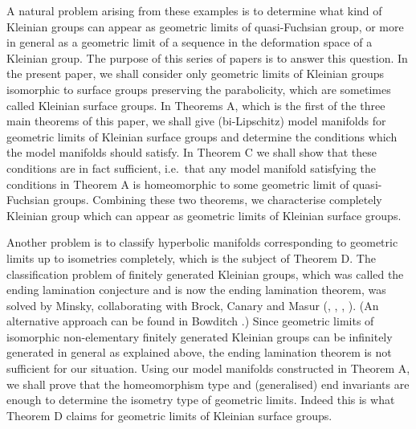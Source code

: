 \documentclass{amsart}
\theoremstyle{definition}
\numberwithin{figure}{section}
\numberwithin{equation}{section}
\newcommand{\ie}{i.e.\ }
\begin{document}
A natural problem arising from these examples is to determine what kind of Kleinian groups can appear as geometric limits of quasi-Fuchsian group, or more in general as a geometric limit of a sequence in the deformation space of a Kleinian group.
The purpose of this series of papers is to answer this question.
In the present paper, we shall consider only geometric limits of Kleinian groups isomorphic to surface groups preserving the parabolicity, which are sometimes called Kleinian surface groups.
In Theorems A, which is the first of the three main theorems of this paper, we shall give (bi-Lipschitz) model manifolds for geometric limits of Kleinian surface groups and determine the conditions which the model manifolds should satisfy.
In Theorem C we shall show that these conditions are in fact sufficient, \ie that any model manifold satisfying the conditions in Theorem A is homeomorphic to some geometric limit of quasi-Fuchsian groups.
Combining these two theorems, we characterise completely Kleinian group which can appear as geometric limits of Kleinian surface groups.

Another problem is to classify hyperbolic manifolds corresponding to geometric limits up to isometries completely, which is the subject of Theorem D.
The classification problem of finitely generated Kleinian groups, which was called the ending lamination conjecture and is now the ending lamination theorem, was solved by Minsky, collaborating with Brock, Canary and Masur (\cite{mm1}, \cite{mm2}, \cite{mi2}, \cite{bcm}).
(An alternative approach can be found in Bowditch \cite{bow4}.)
Since geometric limits of isomorphic non-elementary finitely generated Kleinian groups can be infinitely generated in general as explained above, the ending lamination theorem is not sufficient for our situation.
Using our model manifolds constructed in Theorem A, we shall  prove that the homeomorphism type and (generalised) end invariants are enough to determine the isometry type of geometric limits.
Indeed this is what Theorem D claims for geometric limits of Kleinian surface groups.


\end{document}
